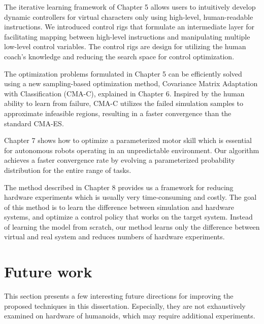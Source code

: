 The iterative learning framework of Chapter 5 allows users to intuitively
develop dynamic controllers for virtual characters only using high-level,
human-readable instructions.
We introduced control rigs that
formulate an intermediate layer 
for facilitating mapping between high-level instructions and manipulating
multiple low-level control variables.
The control rigs are design for utilizing the human coach's knowledge and 
reducing the search space for control optimization.

The optimization problems formulated in Chapter 5 can be efficiently solved
using a new sampling-based optimization method, Covariance Matrix
Adaptation with Classification (CMA-C), explained in Chapter 6.
Inspired by the human ability to learn from failure,
CMA-C utilizes the failed simulation samples to approximate infeasible regions,
resulting in a faster convergence than the standard CMA-ES.

Chapter 7 shows how to optimize a parameterized motor skill which
is essential for autonomous robots operating in an unpredictable environment.
Our algorithm achieves a faster convergence rate by evolving a parameterized
probability distribution for the entire range of tasks.

The method described in Chapter 8 provides us a framework for reducing hardware
experiments which is usually very time-consuming and costly.
The goal of this method is to learn the difference between simulation and
hardware systems, and optimize a control policy that works on the target system.
Instead of learning the model from scratch, our method learns only the
difference between virtual and real system and reduces
numbers of hardware experiments.

\section{Future work}
This section presents a few interesting future directions for improving the
proposed techniques in this dissertation.
Especially, they are not exhaustively examined on hardware
of humanoids, which may require additional experiments.

